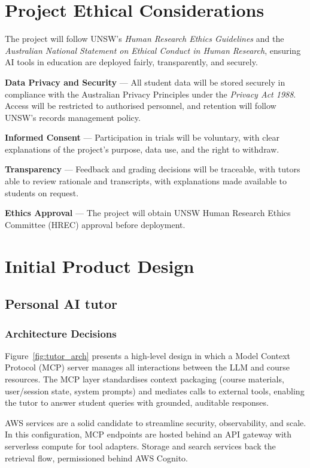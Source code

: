 \section{Project Ethical Considerations}

The project will follow UNSW’s \textit{Human Research Ethics Guidelines} \cite{UNSW2025} and the \textit{Australian National Statement on Ethical Conduct in Human Research}, ensuring AI tools in education are deployed fairly, transparently, and securely.

\textbf{Data Privacy and Security} — All student data will be stored securely in compliance with the Australian Privacy Principles under the \textit{Privacy Act 1988}. Access will be restricted to authorised personnel, and retention will follow UNSW’s records management policy.

\textbf{Informed Consent} — Participation in trials will be voluntary, with clear explanations of the project’s purpose, data use, and the right to withdraw.

\textbf{Transparency} — Feedback and grading decisions will be traceable, with tutors able to review rationale and transcripts, with explanations made available to students on request.

\textbf{Ethics Approval} — The project will obtain UNSW Human Research Ethics Committee (HREC) approval before deployment.

\section{Initial Product Design}

\subsection{Personal AI tutor}

\subsubsection{Architecture Decisions}

Figure~\ref{fig:tutor_arch} presents a high-level design in which a Model Context Protocol (MCP) server manages all interactions between the LLM and course resources. The MCP layer standardises context packaging (course materials, user/session state, system prompts) and mediates calls to external tools, enabling the tutor to answer student queries with grounded, auditable responses.

AWS services are a solid candidate to streamline security, observability, and scale. In this configuration, MCP endpoints are hosted behind an API gateway with serverless compute for tool adapters. Storage and search services back the retrieval flow, permissioned behind AWS Cognito.

